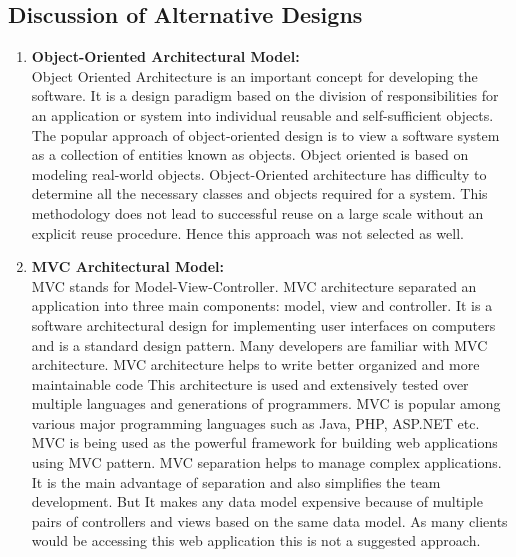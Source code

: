 \documentclass[12pt]{article}
\begin{document}
\subsection{Discussion of Alternative Designs}
\begin{enumerate}

    \item \textbf{Object-Oriented Architectural Model:}\\
    Object Oriented Architecture is an important concept for developing the software. It is a design paradigm based on the division of responsibilities for an application or system into individual reusable and self-sufficient objects. The popular approach of object-oriented design is to view a software system as a collection of entities known as objects. Object oriented is based on modeling real-world objects. Object-Oriented architecture has difficulty to determine all the necessary classes and objects required for a system. This methodology does not lead to successful reuse on a large scale without an explicit reuse procedure. Hence this approach was not selected as well.
    
    \item \textbf{MVC Architectural Model:}\\
    MVC stands for Model-View-Controller. MVC architecture separated an application into three main components: model, view and controller. It is a software architectural design for implementing user interfaces on computers and is a standard design pattern. Many developers are familiar with MVC architecture. MVC architecture helps to write better organized and more maintainable code This architecture is used and extensively tested over multiple languages and generations of programmers. MVC is popular among various major programming languages such as Java, PHP, ASP.NET etc. MVC is being used as the powerful framework for building web applications using MVC pattern. MVC separation helps to manage complex applications. It is the main advantage of separation and also simplifies the team development. But It makes any data model expensive because of multiple pairs of controllers and views based on the same data model. As many clients would be accessing this web application this is not a suggested approach.
\end{enumerate}
\end{document}
